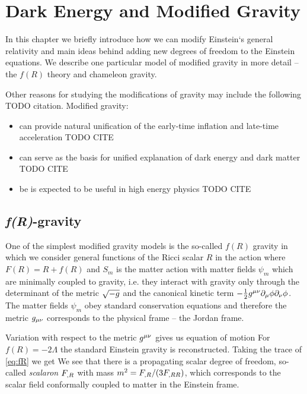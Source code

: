\chapter{Dark Energy and Modified Gravity}
In this chapter we briefly introduce how we can modify Einstein`s general relativity and main ideas behind adding new degrees of freedom to the Einstein equations. We describe one particular model of modified gravity in more detail -- the $f(R)$ theory and chameleon gravity.

Other reasons for studying the modifications of gravity may include the following TODO citation. Modified gravity:
\begin{itemize}
	\item can provide natural unification of the early-time inflation and late-time acceleration TODO CITE
	\item can serve as the basis for unified explanation of dark energy and dark matter TODO CITE
	\item be is expected to be useful in high energy physics TODO CITE
\end{itemize}

\section{\textit{f(R)}-gravity}
One of the simplest modified gravity models is the so-called $f(R)$ gravity in which we consider general functions of the Ricci scalar $R$ in the action
where $F(R)=R+f(R)$ and $S_m$ is the matter action with matter fields $\psi_m$ which are minimally coupled to gravity, i.e. they interact with gravity only through the determinant of the metric $\sqrt{-g}$ and the canonical kinetic term $-\frac12g^{\mu\nu}\partial_\mu\phi\partial_\nu\phi$. The matter fields $\psi_m$ obey standard conservation equations and therefore the metric $g_{\mu\nu}$ corresponds to the physical frame -- the Jordan frame.

Variation with respect to the metric $g^{\mu\nu}$ gives us equation of motion
For $f(R)=-2\Lambda$ the standard Einstein gravity is reconstructed. Taking the trace of \eqref{eq:fR} we get
We see that there is a propagating scalar degree of freedom, so-called \textit{scalaron} $F_{,R}$ with mass $m^2=F_{,R}/(3F_{,RR})$, which corresponds to the scalar field conformally coupled to matter in the Einstein frame.


